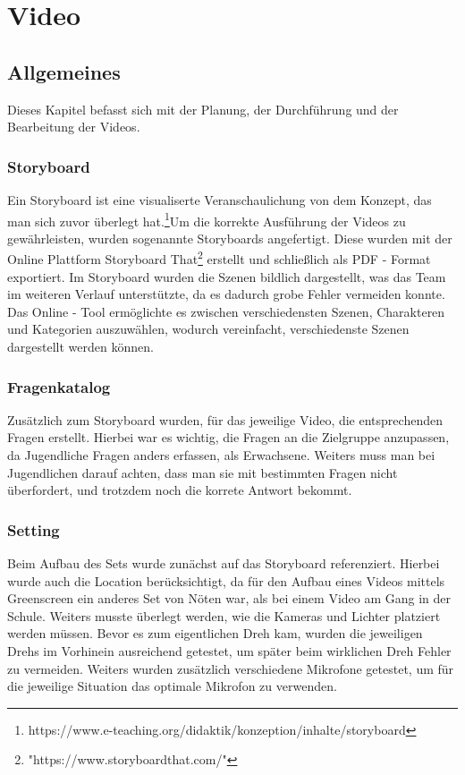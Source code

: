 \chapter{Video}
\section{Allgemeines}
\renewcommand{\kapitelautor}{Autor: Kerstin Schön}
Dieses Kapitel befasst sich mit der Planung, der Durchführung und der Bearbeitung der Videos. 

\subsection{Storyboard}
\renewcommand{\kapitelautor}{Autor: Kerstin Schön}
Ein Storyboard ist eine visualiserte Veranschaulichung von dem Konzept, das man sich zuvor überlegt hat.\footnote{\label{foot:1}https://www.e-teaching.org/didaktik/konzeption/inhalte/storyboard}Um die korrekte Ausführung der Videos zu gewährleisten, wurden sogenannte Storyboards angefertigt. Diese wurden mit der Online Plattform Storyboard That\footnote{\label{foot:2}"https://www.storyboardthat.com/"} erstellt und schließlich als PDF - Format exportiert.
Im Storyboard wurden die Szenen bildlich dargestellt, was das Team im weiteren Verlauf unterstützte, da es dadurch grobe Fehler vermeiden konnte.
Das Online - Tool ermöglichte es zwischen verschiedensten Szenen, Charakteren und Kategorien auszuwählen, wodurch vereinfacht, verschiedenste Szenen dargestellt werden können.
 
\subsection{Fragenkatalog}
\renewcommand{\kapitelautor}{Autor: Kerstin Schön}
Zusätzlich zum Storyboard wurden, für das jeweilige Video, die entsprechenden Fragen erstellt. Hierbei war es wichtig, die Fragen an die Zielgruppe anzupassen, da Jugendliche Fragen anders erfassen, als Erwachsene. Weiters muss man bei Jugendlichen darauf achten, dass man sie mit bestimmten Fragen nicht überfordert, und trotzdem noch die korrete Antwort bekommt.

\subsection{Setting}
\renewcommand{\kapitelautor}{Autor: Kerstin Schön}
Beim Aufbau des Sets wurde zunächst auf das Storyboard referenziert. Hierbei wurde auch die Location berücksichtigt, da für  den Aufbau eines Videos mittels Greenscreen ein anderes Set von Nöten war, als bei einem Video am Gang in der Schule. Weiters musste überlegt werden, wie die Kameras und Lichter platziert werden müssen. Bevor es zum eigentlichen Dreh kam, wurden die jeweiligen Drehs im Vorhinein ausreichend getestet, um später beim wirklichen Dreh Fehler zu vermeiden. Weiters wurden zusätzlich verschiedene Mikrofone getestet, um für die jeweilige Situation das optimale Mikrofon zu verwenden.


